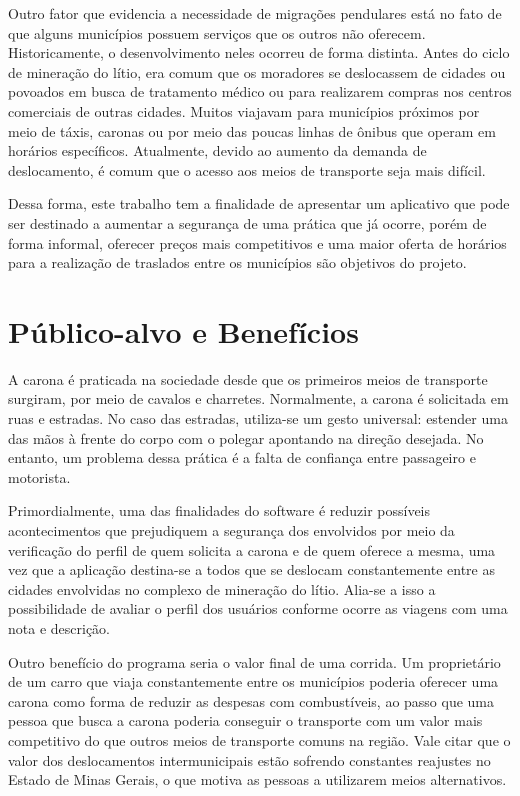Outro fator que evidencia a necessidade de migrações pendulares está no fato de que alguns municípios possuem serviços que os outros não oferecem. Historicamente, o desenvolvimento neles ocorreu de forma distinta. Antes do ciclo de mineração do lítio, era comum que os moradores se deslocassem de cidades ou povoados em busca de tratamento médico ou para realizarem compras nos centros comerciais de outras cidades. Muitos viajavam para municípios próximos por meio de táxis, caronas ou por meio das poucas linhas de ônibus que operam em horários específicos. Atualmente, devido ao aumento da demanda de deslocamento, é comum que o acesso aos meios de transporte seja mais difícil. 

Dessa forma, este trabalho tem a finalidade de apresentar um aplicativo que pode ser destinado a aumentar a segurança de uma prática que já ocorre, porém de forma informal, oferecer preços mais competitivos e uma maior oferta de horários para a realização de traslados entre os municípios são objetivos do projeto.

\section{Público-alvo e Benefícios}

A carona é praticada na sociedade desde que os primeiros meios de transporte surgiram, por meio de cavalos e charretes. Normalmente, a carona é solicitada em ruas e estradas. No caso das estradas, utiliza-se um gesto universal: estender uma das mãos à frente do corpo com o polegar apontando na direção desejada. No entanto, um problema dessa prática é a falta de confiança entre passageiro e motorista.

Primordialmente, uma das finalidades do software é reduzir possíveis acontecimentos que prejudiquem a segurança dos envolvidos por meio da verificação do perfil de quem solicita a carona e de quem oferece a mesma, uma vez que a aplicação destina-se a todos que se deslocam constantemente entre as cidades envolvidas no complexo de mineração do lítio. Alia-se a isso a possibilidade de avaliar o perfil dos usuários conforme ocorre as viagens com uma nota e descrição. 

Outro benefício do programa seria o valor final de uma corrida. Um proprietário de um carro que viaja constantemente entre os municípios poderia oferecer uma carona como forma de reduzir as despesas com combustíveis, ao passo que uma pessoa que busca a carona poderia conseguir o transporte com um valor mais competitivo do que outros meios de transporte comuns na região. Vale citar que o valor dos deslocamentos intermunicipais estão sofrendo constantes reajustes no Estado de Minas Gerais, o que motiva as pessoas a utilizarem meios alternativos. 

